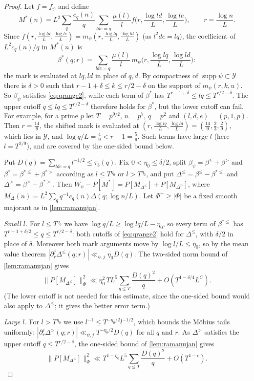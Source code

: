 \documentclass[11pt,colorlinks]{charlie}
\begin{document}
\begin{proof}
Let $f=f_\psi$ and define
\[
 M^*(n)=L^2\sum_q\frac{c_q(n)}q\sum_{lde=q}\frac{\mu(l)}lf\Big(r,\frac{\log ld}L,\frac{\log le}L\Big),\qquad r=\frac{\log n}L .
\]
Since $f(r,\frac{\log ld}L,\frac{\log le}L)=m_\psi(r,\frac{\log lq}L,\frac{\log ld}L)$ (as $l^2de=lq$), the coefficient of $L^2c_q(n)/q$ in $M^*(n)$ is
\[
 \beta^*(q;r)=\sum_{lde=q}\frac{\mu(l)}l\,m_\psi\Big(r,\frac{\log lq}L,\frac{\log ld}L\Big):
\]
the mark is evaluated at $lq,ld$ in place of $q,d$. By compactness of $\operatorname{supp}\psi\subset\mathcal Y$ there is $\delta>0$ such that $r-1+\delta\le k\le r/2-\delta$ on the support of $m_\psi(r,k,u)$. So $\beta_\psi$ satisfies \eqref{eq:qrange2}, while each term of $\beta^*$ has $T^{r-1+\delta}\le lq\le T^{r/2-\delta}$. The upper cutoff $q\le lq\le T^{r/2-\delta}$ therefore holds for $\beta^*$, but the lower cutoff can fail. For example, for a prime $p$ let $T=p^{9/2}$, $n=p^7$, $q=p^2$ and $(l,d,e)=(p,1,p)$. Then $r=\frac{14}9$, the shifted mark is evaluated at $(r,\frac{\log lq}L,\frac{\log ld}L)=(\frac{14}9,\frac23,\frac29)$, which lies in $\mathcal Y$, and $\log q/L=\frac49<r-1=\frac59$. Such terms have large $l$ (here $l=T^{2/9}$), and are covered by the one-sided bound below.

Put $D(q)=\sum_{lde=q}l^{-1/2}\le\tau_3(q)$. Fix $0<\eta_0\le\delta/2$, split $\beta_\psi=\beta^{\le}+\beta^{>}$ and $\beta^*=\beta^{*\le}+\beta^{*>}$ according as $l\le T^{\eta_0}$ or $l>T^{\eta_0}$, and put $\Delta^{\le}=\beta^{\le}-\beta^{*\le}$ and $\Delta^{>}=\beta^{>}-\beta^{*>}$. Then $W_\psi-P[M^*]=P[M_{\Delta^\le}]+P[M_{\Delta^>}]$, where $M_\Delta(n)=L^2\sum_qq^{-1}c_q(n)\Delta(q;\log n/L)$. Let $\Phi^+\ge|\Phi|$ be a fixed smooth majorant as in \cref{lem:ramanujan}.

\emph{Small $l$.} For $l\le T^{\eta_0}$ we have $\log q/L\ge\log lq/L-\eta_0$, so every term of $\beta^{*\le}$ has $T^{r-1+\delta/2}\le q\le T^{r/2-\delta}$: both cutoffs of \eqref{eq:qrange2} hold for $\Delta^\le$, with $\delta/2$ in place of $\delta$. Moreover both mark arguments move by $\log l/L\le\eta_0$, so by the mean value theorem $|\partial_r^j\Delta^\le(q;r)|\ll_{\psi,j}\eta_0D(q)$. The two-sided norm bound of \cref{lem:ramanujan} gives
\[
 \|P[M_{\Delta^\le}]\|_\Phi^2\ll\eta_0^2\,TL^5\sum_{q\le T}\frac{D(q)^2}q+O(T^{1-\delta/4}L^C).
\]
(The lower cutoff is not needed for this estimate, since the one-sided bound would also apply to $\Delta^\le$; it gives the better error term.)

\emph{Large $l$.} For $l>T^{\eta_0}$ we use $l^{-1}\le T^{-\eta_0/2}l^{-1/2}$, which bounds the M\"obius tails uniformly: $|\partial_r^j\Delta^>(q;r)|\ll_{\psi,j}T^{-\eta_0/2}D(q)$ for all $q$ and $r$. As $\Delta^>$ satisfies the upper cutoff $q\le T^{r/2-\delta}$, the one-sided bound of \cref{lem:ramanujan} gives
\[
 \|P[M_{\Delta^>}]\|_\Phi^2\ll T^{1-\eta_0}L^5\sum_{q\le T}\frac{D(q)^2}q+O(T^{1-c}).
\]


\end{proof}
\end{document}
